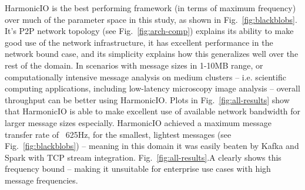 \documentclass[conference]{IEEEtran}
\begin{document}

HarmonicIO is the best performing framework (in terms of maximum frequency) over much of the parameter space in this study, as shown in Fig.~\ref{fig:blackblobs}. 
It's P2P network topology (see Fig.~\ref{fig:arch-comp}) explains its ability to make good use of the network infrastructure, it has excellent performance in the network bound case, and its simplicity explains how this generalizes well over the rest of the domain. In scenarios with message sizes in 1-10MB range, or computationally intensive message analysis on medium clusters -- i.e. scientific computing applications, including low-latency microscopy image analysis -- overall throughput can be better using HarmonicIO. Plots in Fig.~\ref{fig:all-results} show that HarmonicIO is able to make excellent use of available network bandwidth for larger message sizes especially.
HarmonicIO achieved a maximum message transfer rate of ~625Hz, for the smallest, lightest messages (see Fig.~\ref{fig:blackblobs}) -- meaning in this domain it was easily beaten by Kafka and Spark with TCP stream integration. Fig.~\ref{fig:all-results}.A clearly shows this frequency bound -- making it unsuitable for enterprise use cases with high message frequencies.


\end{document}
